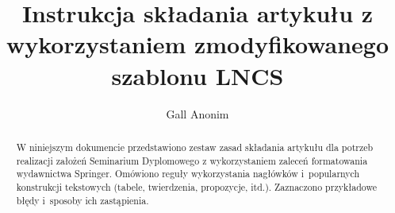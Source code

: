 

\title{Instrukcja składania artykułu z wykorzystaniem zmodyfikowanego szablonu LNCS}
\author{Gall Anonim}



\maketitle

\begin{abstract}
	W niniejszym dokumencie przedstawiono zestaw zasad składania artykułu dla potrzeb realizacji założeń Seminarium Dyplomowego z wykorzystaniem zaleceń formatowania wydawnictwa Springer. Omówiono reguły wykorzystania nagłówków i~popularnych konstrukcji tekstowych (tabele, twierdzenia, propozycje, itd.). Zaznaczono przykładowe błędy i~sposoby ich zastąpienia.

\end{abstract}




\begin{thebibliography}{}

\end{thebibliography}


